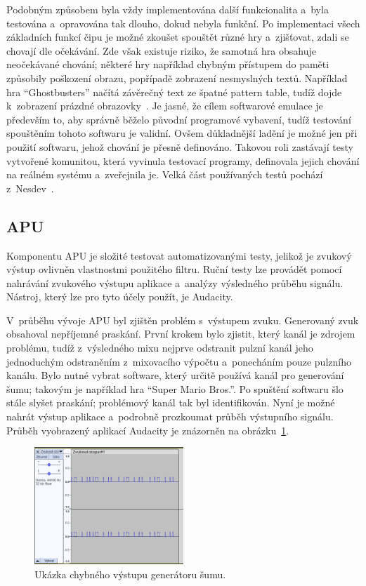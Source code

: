 Podobným způsobem byla vždy implementována další funkcionalita a~byla testována a~opravována tak dlouho, dokud nebyla funkční. Po implementaci všech základních funkcí čipu je možné zkoušet spouštět různé hry a~zjišťovat, zdali se chovají dle očekávání. Zde však existuje riziko, že samotná hra obsahuje neočekávané chování; některé hry například chybným přístupem do paměti způsobily poškození obrazu, popřípadě zobrazení nesmyslných textů. Například hra \enquote{Ghostbusters} načítá závěrečný text ze špatné pattern table, tudíž dojde k~zobrazení prázdné obrazovky~\cite{Nesdev:game-bugs}. Je jasné, že cílem softwarové emulace je především to, aby správně běželo původní programové vybavení, tudíž testování spouštěním tohoto softwaru je validní. Ovšem důkladnější ladění je možné jen při použití softwaru, jehož chování je přesně definováno. Takovou roli zastávají testy vytvořené komunitou, která vyvinula testovací programy, definovala jejich chování na reálném systému a~zveřejnila je. Velká část používaných testů pochází z~Nesdev~\cite{Nesdev:tests}.

\subsection{APU}
Komponentu APU je složité testovat automatizovanými testy, jelikož je zvukový výstup ovlivněn vlastnostmi použitého filtru. Ruční testy lze provádět pomocí nahrávání zvukového výstupu aplikace a~analýzy výsledného průběhu signálu. Nástroj, který lze pro tyto účely použít, je Audacity.

V~průběhu vývoje APU byl zjištěn problém s~výstupem zvuku. Generovaný zvuk obsahoval nepříjemné praskání. První krokem bylo zjistit, který kanál je zdrojem problému, tudíž z~výsledného mixu nejprve odstranit pulzní kanál jeho jednoduchým odstraněním z~mixovacího výpočtu a~ponecháním pouze pulzního kanálu. Bylo nutné vybrat software, který určitě používá kanál pro generování šumu; takovým je například hra \enquote{Super Mario Bros.}. Po spuštění softwaru šlo stále slyšet praskání; problémový kanál tak byl identifikován. Nyní je možné nahrát výstup aplikace a~podrobně prozkoumat průběh výstupního signálu. Průběh vyobrazený aplikací Audacity je znázorněn na obrázku~\ref{fig:test-sum-chybne}.

\begin{figure}[ht!]
	\centering
	\includegraphics[width=0.5\textwidth]{images/audacity_chybne.png}
	\caption{Ukázka chybného výstupu generátoru šumu.}
	\label{fig:test-sum-chybne}
\end{figure}

